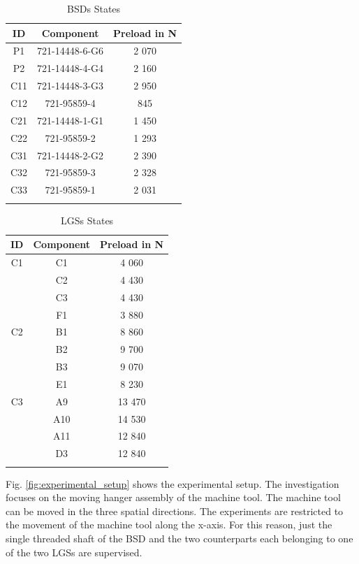 \begin{center}
\begin{longtable}{c c c} 
\toprule
 ID & Component & Preload in N \\ [0.5ex] 
\midrule
 P1 & 721-14448-6-G6 & 2 070 \\ 
 P2 & 721-14448-4-G4 & 2 160 \\ 
 C11 & 721-14448-3-G3 & 2 950 \\ 
 C12 & 721-95859-4 & 845 \\ 
 C21  & 721-14448-1-G1 & 1 450 \\ [1ex] 
 C22  & 721-95859-2 & 1 293 \\ [1ex] 
 C31  & 721-14448-2-G2 & 2 390 \\ [1ex] 
 C32  & 721-95859-3 & 2 328 \\ [1ex] 
 C33 & 721-95859-1 & 2 031 \\ [1ex]
\bottomrule
\caption {BSDs States}
\label {tab:BSDs_states}
\end{longtable}
\end{center}


\begin{center}
\begin{longtable}{c c c} 
\toprule
 ID & Component & Preload in N \\ [0.5ex] 
\midrule
 C1 & C1 & 4 060 \\ 
    & C2 & 4 430 \\ 
    & C3 & 4 430 \\
    & F1 & 3 880 \\ 
\midrule
 C2 & B1 & 8 860 \\ 
    & B2 & 9 700 \\ [1ex] 
    & B3 & 9 070 \\ [1ex]
    & E1 & 8 230 \\ [1ex]
\midrule
 C3 & A9 & 13 470 \\ 
    & A10 & 14 530 \\ [1ex] 
    & A11 & 12 840 \\ [1ex]
    & D3 & 12 840 \\ [1ex]
\bottomrule
\caption {LGSs States}
\label {tab:LGSs_states}
\end{longtable}
\end{center}

Fig. \ref{fig:experimental_setup} shows the experimental setup. The investigation focuses on the moving hanger assembly of the machine tool. The machine tool can be moved in the three spatial directions. The experiments are restricted to the movement of the machine tool along the x-axis. For this reason, just the single threaded shaft of the BSD and the two counterparts each belonging to one of the two LGSs are supervised.

